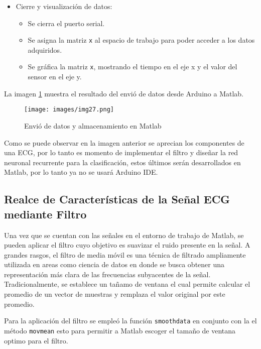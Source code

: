 \begin{itemize}
    \item Cierre y visualización de datos:
          \begin{itemize}
              \item Se cierra el puerto serial.
              \item Se asigna la matriz \texttt{x} al espacio de trabajo para poder acceder a los datos adquiridos.
              \item Se gráfica la matriz \texttt{x}, mostrando el tiempo en el eje x y el valor del sensor en el eje y.
          \end{itemize}
\end{itemize}

La imagen \ref{fig:Workspace} muestra el resultado del envió de datos desde Arduino a Matlab.

\begin{figure}[!ht]
    \centering
    \texttt{[image: images/img27.png]}
    \caption{Envió de datos y almacenamiento en Matlab}
    \label{fig:Workspace}

\end{figure}

Como se puede observar en la imagen anterior se aprecian los componentes de una ECG, por lo tanto es momento de implementar el filtro y diseñar la red neuronal recurrente para la clasificación, estos últimos serán desarrollados en Matlab, por lo tanto ya no se usará Arduino IDE.

\subsection[]{Realce de Características de la Señal ECG mediante Filtro}
Una vez que se cuentan con las señales en el entorno de trabajo de Matlab, se pueden aplicar el filtro cuyo objetivo es suavizar el ruido presente en la señal. A grandes rasgos, el filtro de media móvil es una técnica de filtrado ampliamente utilizada en areas como ciencia de datos en donde se busca obtener una representación más clara de las frecuencias subyacentes de la señal. Tradicionalmente, se establece un tañamo de ventana el cual permite calcular el promedio de un vector de muestras y remplaza el valor original por este promedio.

Para la aplicación del filtro se empleó la función \texttt{smoothdata} en conjunto con la el método \texttt{movmean} esto para permitir a Matlab escoger el tamaño de ventana optimo para el filtro.\\


